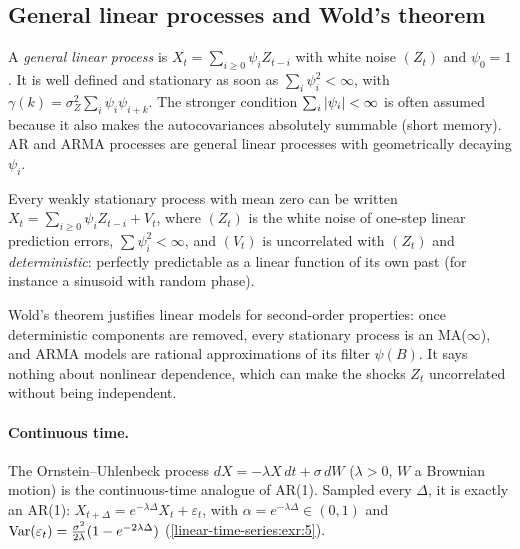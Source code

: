 \begin{notechapter}
\section{General linear processes and Wold's theorem}\label{linear-time-series:sec:wold}

A \emph{general linear process} is $X_t = \sum_{i\geq0}\psi_iZ_{t-i}$ with white noise $(Z_t)$ and $\psi_0 = 1$. It is well
defined and stationary as soon as $\sum_i\psi_i^2<\infty$, with $\gamma(k) = \sigma_Z^2\sum_i\psi_i\psi_{i+k}$. The stronger
condition $\sum_i\left|\psi_i\right|<\infty$ is often assumed because it also makes the autocovariances absolutely
summable (short memory). AR and ARMA processes are general linear processes with
geometrically decaying $\psi_i$.

\begin{theorem}\label{linear-time-series:thm:wold}
Every weakly stationary process with mean zero can be written $X_t = \sum_{i\geq0}\psi_iZ_{t-i} + V_t$, where
$(Z_t)$ is the white noise of one-step linear prediction errors, $\sum\psi_i^2<\infty$, and $(V_t)$ is
uncorrelated with $(Z_t)$ and \emph{deterministic}: perfectly predictable as a linear function of
its own past (for instance a sinusoid with random phase).
\end{theorem}

Wold's theorem justifies linear models for second-order properties: once deterministic
components are removed, every stationary process is an MA($\infty$), and ARMA models are
rational approximations of its filter $\psi(B)$. It says nothing about nonlinear dependence,
which can make the shocks $Z_t$ uncorrelated without being independent.

\paragraph{Continuous time.} The Ornstein--Uhlenbeck process $dX = -\lambda X\,dt + \sigma\,dW$ ($\lambda>0$, $W$ a Brownian
motion) is the continuous-time analogue of AR(1). Sampled every $\Delta$, it is exactly an AR(1):
$X_{t+\Delta} = e^{-\lambda\Delta}X_t + \varepsilon_t$, with $\alpha = e^{-\lambda\Delta}\in(0, 1)$ and $\operatorname{Var}(\varepsilon_t) = \frac{\sigma^2}{2\lambda}(1 - e^{-2\lambda\Delta})$
(\cref{linear-time-series:exr:5}).


\end{notechapter}
